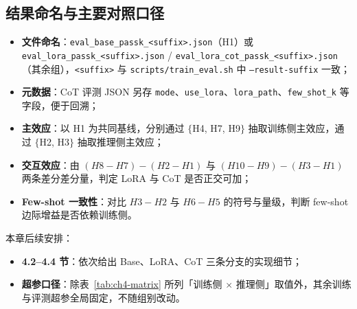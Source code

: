\subsection{结果命名与主要对照口径}
\begin{itemize}
    \item \textbf{文件命名}：\texttt{eval\_base\_passk\_<suffix>.json}（H1）或 \texttt{eval\_lora\_\allowbreak passk\_<suffix>.json} / \texttt{eval\_lora\_cot\_passk\_<suffix>.json}（其余组），\texttt{<suffix>} 与 \texttt{scripts/train\_eval.sh} 中 \texttt{--result-suffix} 一致；
    \item \textbf{元数据}：CoT 评测 JSON 另存 \texttt{mode}、\texttt{use\_lora}、\texttt{lora\_path}、\texttt{few\_shot\_k} 等字段，便于回溯；
    \item \textbf{主效应}：以 H1 为共同基线，分别通过 $\{$H4, H7, H9$\}$ 抽取训练侧主效应，通过 $\{$H2, H3$\}$ 抽取推理侧主效应；
    \item \textbf{交互效应}：由 $(H8-H7)-(H2-H1)$ 与 $(H10-H9)-(H3-H1)$ 两条差分差分量，判定 LoRA 与 CoT 是否正交可加；
    \item \textbf{Few-shot 一致性}：对比 $H3-H2$ 与 $H6-H5$ 的符号与量级，判断 few-shot 边际增益是否依赖训练侧。
\end{itemize}
本章后续安排：
\begin{itemize}
    \item \textbf{4.2--4.4 节}：依次给出 Base、LoRA、CoT 三条分支的实现细节；
    \item \textbf{超参口径}：除表~\ref{tab:ch4-matrix} 所列「训练侧 $\times$ 推理侧」取值外，其余训练与评测超参全局固定，不随组别改动。
\end{itemize}